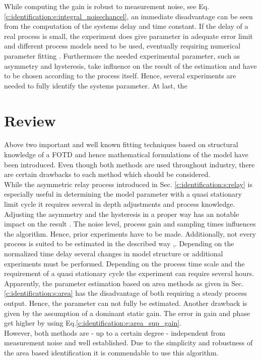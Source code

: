 While computing the gain is robust to measurement noise, see Eq. \ref{c:identification:e:integral_noisechancel}, an immediate disadvantage can be seen from the computation of the systems delay and time constant. If the delay of a real process is small, the experiment does give parameter in adequate error limit \cite{Berner2016a} and different process models need to be used, eventually requiring numerical parameter fitting \cite[p. 31 ff.]{Berner2015}. Furthermore the needed experimental parameter, such as asymmetry and hysteresis, take influence on the result of the estimation \cite{Berner2016a} and have to be chosen according to the process itself. Hence, several experiments are needed to fully identify the systems parameter. At last, the 

\section{Review}
\label{c:identification:s:review}

Above two important and well known fitting techniques based on structural knowledge of a FOTD and hence mathematical formulations of the model have been introduced. Even though both methods are used throughout industry, there are certain drawbacks to each method which should be considered.\\

While the asymmetric relay process introduced in Sec. \ref{c:identification:s:relay} is especially useful in determining the model parameter with a quasi stationary limit cycle it requires several in depth adjustments and process knowledge. Adjusting the asymmetry and the hysteresis in a proper way has an notable impact on the result \cite{Berner2016a}. The noise level, process gain and sampling times influences the algorithm. Hence, prior experiments have to be made. Additionally, not every process is suited to be estimated in the described way \cite{Berner2016a},\cite{Berner2015}. Depending on the normalized time delay several changes in model structure or additional experiments must be performed. Depending on the process time scale and the requirement of a quasi stationary cycle the experiment can require several hours.\\

Apparently, the parameter estimation based on area methods as given in Sec.\ref{c:identification:s:area} has the disadvantage of both requiring a steady process output. Hence, the parameter can not fully be estimated. Another drawback is given by the assumption of a dominant static gain. The error in gain and phase get higher by using Eq.\ref{c:identification:e:area_sup_gain}.\\

However, both methods are - up to a certain degree - independent from measurement noise and well established. Due to the simplicity and robustness of the area based identification it is commendable to use this algorithm. 
